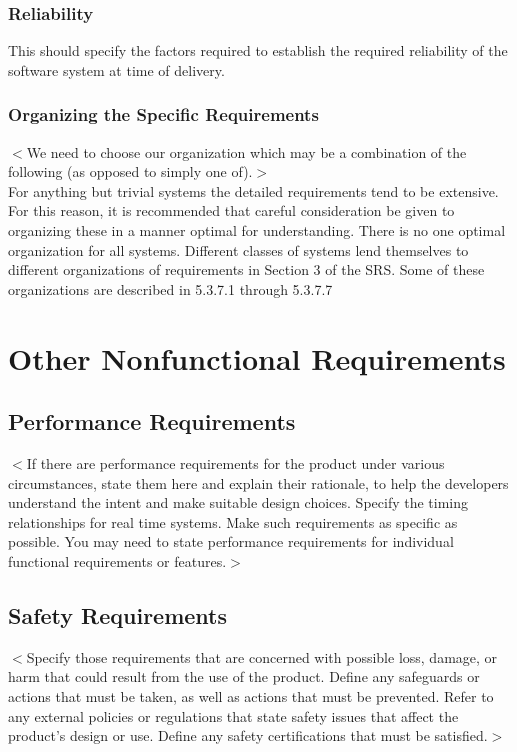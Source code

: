\documentclass[draftclsnofoot,onecolumn,10pt]{IEEEtran}
\begin{document}
\subsubsection{Reliability}
This should specify the factors required to establish the required reliability
of the software system at time of delivery.

\subsubsection{Organizing the Specific Requirements}
$<$We need to choose our organization which may be a combination of the
following (as opposed to simply one of).$>$\\
For anything but trivial systems the detailed requirements tend to be extensive.
For this reason, it is recommended that careful consideration be given to
organizing these in a manner optimal for understanding. There is no one optimal
organization for all systems. Different classes of systems lend themselves to
different organizations of requirements in Section 3 of the SRS. Some of these
organizations are described in 5.3.7.1 through 5.3.7.7


\section{Other Nonfunctional Requirements}

\subsection{Performance Requirements}
$<$If there are performance requirements for the product under various 
circumstances, state them here and explain their rationale, to help the 
developers understand the intent and make suitable design choices. Specify the 
timing relationships for real time systems. Make such requirements as specific 
as possible. You may need to state performance requirements for individual 
functional requirements or features.$>$

\subsection{Safety Requirements}
$<$Specify those requirements that are concerned with possible loss, damage, or 
harm that could result from the use of the product. Define any safeguards or 
actions that must be taken, as well as actions that must be prevented. Refer to 
any external policies or regulations that state safety issues that affect the 
product’s design or use. Define any safety certifications that must be 
satisfied.$>$
\end{document}
